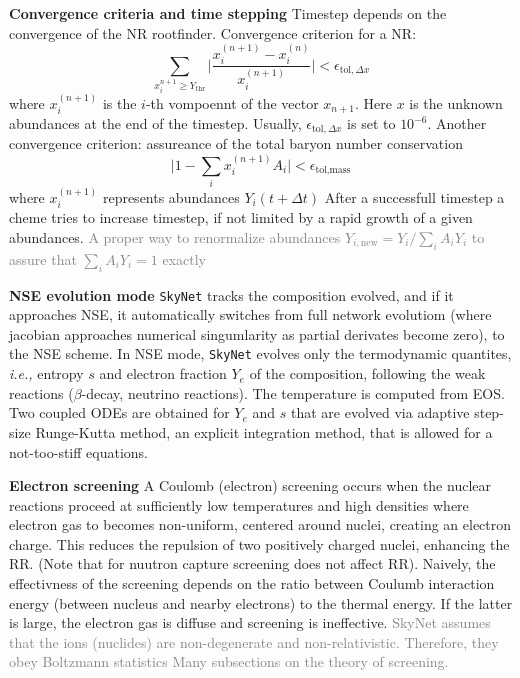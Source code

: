 \documentclass[11pt,a4paper,headinclude=true,DIV=14,BCOR=8mm,chapterprefix,listof=totoc,twoside,openright,abstracton]{scrbook}
\newcommand{\gray}[1]{\textcolor{gray}{#1}}
\begin{document}
\begin{sidenote}
    \textbf{Convergence criteria and time stepping}
    Timestep depends on the convergence of the NR rootfinder. 
    Convergence criterion for a NR:
    \begin{equation}
        \sum_{x_i^{n+1}\geq Y_{\text{thr}}}\Bigg|\frac{x_{i}^{(n+1)} - x_{i}^{(n)}}{x_{i}^{(n+1)}}\Bigg| < \epsilon_{\text{tol},\Delta x}
    \end{equation}
    where $x_{i}^{(n+1)}$ is the $i$-th vompoennt of the vector $x_{n+1}$. Here $x$ is the unknown abundances at the end of the timestep. Usually, $\epsilon_{\text{tol},\Delta x}$ is set to $10^{-6}$.
    Another convergence criterion: assureance of the total baryon number conservation 
    \begin{equation}
        \Bigg| 1- \sum_i x_i^{(n+1)}A_i \Bigg| < \epsilon_{\text{tol},\text{mass}}
    \end{equation}
    where $x_{i}^{(n+1)}$ represents abundances $Y_i(t+\Delta t)$
    After a successfull timestep a cheme tries to increase timestep, if not limited by a rapid growth of a given abundances. 
    \gray{A proper way to renormalize abundances $Y_{i,\text{new}} = Y_i/\sum_i A_i Y_i$
    to assure that $\sum_i A_i Y_i = 1$ exactly}
\end{sidenote}

\begin{sidenote}
    \textbf{NSE evolution mode} 
    \texttt{SkyNet} tracks the composition evolved, and if it approaches NSE, it automatically switches from full network evolutiom (where jacobian approaches numerical singumlarity as partial derivates become zero), to the NSE scheme. 
    In NSE mode, \texttt{SkyNet} evolves only the termodynamic quantites, \textit{i.e.,} entropy $s$ and electron fraction $Y_e$ of the composition, following the weak reactions ($\beta$-decay, neutrino reactions). The temperature is computed from EOS. 
    Two coupled ODEs are obtained for $Y_e$ and $s$ that are evolved via adaptive step-size Runge-Kutta method, an explicit integration method, that is allowed for a not-too-stiff equations.
\end{sidenote}

\begin{sidenote}
    \textbf{Electron screening}
    A Coulomb (electron) screening occurs when the nuclear reactions proceed at sufficiently low temperatures and high densities where electron gas to becomes non-uniform, centered around nuclei, creating an electron charge. This reduces the repulsion of two positively charged nuclei, enhancing the RR. (Note that for nuutron capture screening does not affect RR).
    Naively, the effectivness of the screening depends on the ratio between Coulumb interaction energy (between nucleus and nearby electrons) to the thermal energy. If the latter is large, the electron gas is diffuse and screening is ineffective.
    \gray{SkyNet assumes that the ions (nuclides) are non-degenerate and non-relativistic.
        Therefore, they obey Boltzmann statistics}
    \gray{Many subsections on the theory of screening.}
\end{sidenote}
\end{document}
